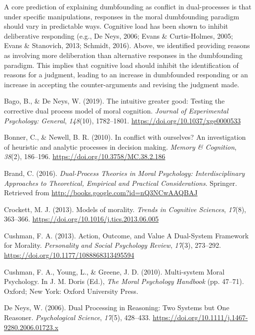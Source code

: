 \documentclass[
  american,
  man,floatsintext]{apa7}
\begin{document}
A core prediction of explaining dumbfounding as conflict in dual-processes is that under specific manipulations, responses in the moral dumbfounding paradigm should vary in predictable ways. Cognitive load has been shown to inhibit deliberative responding (e.g., De Neys, 2006; Evans \& Curtis-Holmes, 2005; Evans \& Stanovich, 2013; Schmidt, 2016). Above, we identified providing reasons as involving more deliberation than alternative responses in the dumbfounding paradigm. This implies that cognitive load should inhibit the identification of reasons for a judgment, leading to an increase in dumbfounded responding or an increase in accepting the counter-arguments and revising the judgment made.

\hypertarget{refs}{}
\leavevmode\hypertarget{ref-bago_intuitive_2019}{}%
Bago, B., \& De Neys, W. (2019). The intuitive greater good: Testing the corrective dual process model of moral cognition. \emph{Journal of Experimental Psychology: General}, \emph{148}(10), 1782--1801. \url{https://doi.org/10.1037/xge0000533}

\leavevmode\hypertarget{ref-bonner_conflict_2010}{}%
Bonner, C., \& Newell, B. R. (2010). In conflict with ourselves? An investigation of heuristic and analytic processes in decision making. \emph{Memory \& Cognition}, \emph{38}(2), 186--196. \url{https://doi.org/10.3758/MC.38.2.186}

\leavevmode\hypertarget{ref-brand_dualprocess_2016}{}%
Brand, C. (2016). \emph{Dual-Process Theories in Moral Psychology: Interdisciplinary Approaches to Theoretical, Empirical and Practical Considerations}. Springer. Retrieved from \url{http://books.google.com?id=nQ3NCwAAQBAJ}

\leavevmode\hypertarget{ref-crockett_models_2013}{}%
Crockett, M. J. (2013). Models of morality. \emph{Trends in Cognitive Sciences}, \emph{17}(8), 363--366. \url{https://doi.org/10.1016/j.tics.2013.06.005}

\leavevmode\hypertarget{ref-cushman_action_2013}{}%
Cushman, F. A. (2013). Action, Outcome, and Value A Dual-System Framework for Morality. \emph{Personality and Social Psychology Review}, \emph{17}(3), 273--292. \url{https://doi.org/10.1177/1088868313495594}

\leavevmode\hypertarget{ref-cushman_multisystem_2010}{}%
Cushman, F. A., Young, L., \& Greene, J. D. (2010). Multi-system Moral Psychology. In J. M. Doris (Ed.), \emph{The Moral Psychology Handbook} (pp. 47--71). Oxford; New York: Oxford University Press.

\leavevmode\hypertarget{ref-deneys_dual_2006}{}%
De Neys, W. (2006). Dual Processing in Reasoning: Two Systems but One Reasoner. \emph{Psychological Science}, \emph{17}(5), 428--433. \url{https://doi.org/10.1111/j.1467-9280.2006.01723.x}
\end{document}
